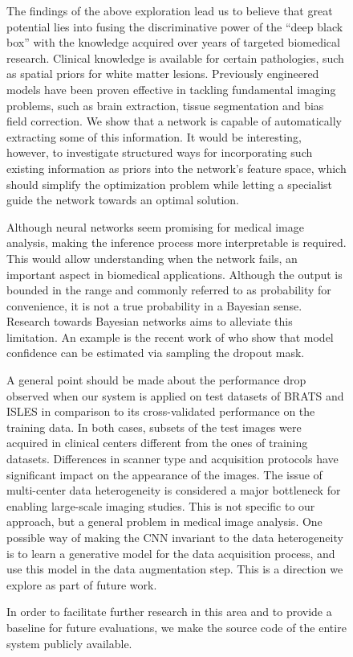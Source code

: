 \documentclass[preprint,authoryear,12pt]{elsarticle}
\newcommand{\quot}[1]{``#1''}
\begin{document}
\begin{figure}[h]
The findings of the above exploration lead us to believe that great potential lies into fusing the discriminative power of the \quot{deep black box} with the knowledge acquired over years of targeted biomedical research. Clinical knowledge is available for certain pathologies, such as spatial priors for white matter lesions. Previously engineered models have been proven effective in tackling fundamental imaging problems, such as brain extraction, tissue segmentation and bias field correction. We show that a network is capable of automatically extracting some of this information. It would be interesting, however, to investigate structured ways for incorporating such existing information as priors into the network's feature space, which should simplify the optimization problem while letting a specialist guide the network towards an optimal solution.

Although neural networks seem promising for medical image analysis, making the inference process more interpretable is required. This would allow understanding when the network fails, an important aspect in biomedical applications. Although the output is bounded in the  range and commonly referred to as probability for convenience, it is not a true probability in a Bayesian sense. Research towards Bayesian networks aims to alleviate this limitation. An example is the recent work of \cite{Gal2015} who show that model confidence can be estimated via sampling the dropout mask.

A general point should be made about the performance drop observed when our system is applied on test datasets of BRATS and ISLES in comparison to its cross-validated performance on the training data. In both cases, subsets of the test images were acquired in clinical centers different from the ones of training datasets. Differences in scanner type and acquisition protocols have significant impact on the appearance of the images. The issue of multi-center data heterogeneity is considered a major bottleneck for enabling large-scale imaging studies. This is not specific to our approach, but a general problem in medical image analysis. One possible way of making the CNN invariant to the data heterogeneity is to learn a generative model for the data acquisition process, and use this model in the data augmentation step. This is a direction we explore as part of future work.

In order to facilitate further research in this area and to provide a baseline for future evaluations, we make the source code of the entire system publicly available.
 






\end{figure}
\end{document}
